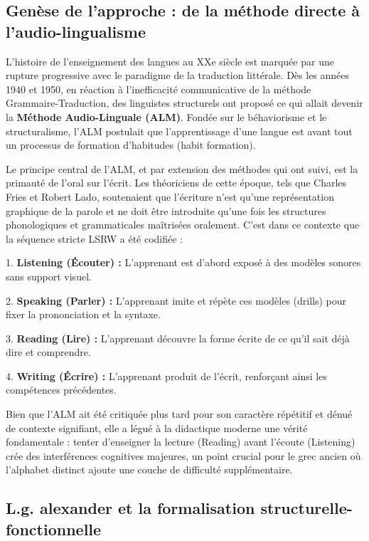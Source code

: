 \subsection{Genèse de l'approche : de la méthode directe à l'audio-lingualisme}

L'histoire de l'enseignement des langues au XXe siècle est marquée par une rupture progressive avec
le paradigme de la traduction littérale. Dès les années 1940 et 1950, en réaction à l'inefficacité
communicative de la méthode Grammaire-Traduction, des linguistes structurels ont proposé ce qui
allait devenir la \textbf{Méthode Audio-Linguale (ALM)}.\cite{III-2-1-ref5} Fondée sur le
béhaviorisme et le structuralisme, l'ALM postulait que l'apprentissage d'une langue est avant tout
un processus de formation d'habitudes (habit formation).

Le principe central de l'ALM, et par extension des méthodes qui ont suivi, est la primauté de l'oral
sur l'écrit. Les théoriciens de cette époque, tels que Charles Fries et Robert Lado, soutenaient que
l'écriture n'est qu'une représentation graphique de la parole et ne doit être introduite qu'une fois
les structures phonologiques et grammaticales maîtrisées oralement.\cite{III-2-1-ref7} C'est dans ce
contexte que la séquence stricte LSRW a été codifiée :

1. \textbf{Listening (Écouter) :} L'apprenant est d'abord exposé à des modèles sonores sans support
visuel.

2. \textbf{Speaking (Parler) :} L'apprenant imite et répète ces modèles (drills) pour fixer la
prononciation et la syntaxe.

3. \textbf{Reading (Lire) :} L'apprenant découvre la forme écrite de ce qu'il sait déjà dire et
comprendre.

4. \textbf{Writing (Écrire) :} L'apprenant produit de l'écrit, renforçant ainsi les compétences
précédentes.\cite{III-2-1-ref6}

Bien que l'ALM ait été critiquée plus tard pour son caractère répétitif et dénué de contexte
signifiant, elle a légué à la didactique moderne une vérité fondamentale : tenter d'enseigner la
lecture (Reading) avant l'écoute (Listening) crée des interférences cognitives majeures, un point
crucial pour le grec ancien où l'alphabet distinct ajoute une couche de difficulté
supplémentaire.\cite{III-2-1-ref8}



\subsection{L.g. alexander et la formalisation structurelle-fonctionnelle}

